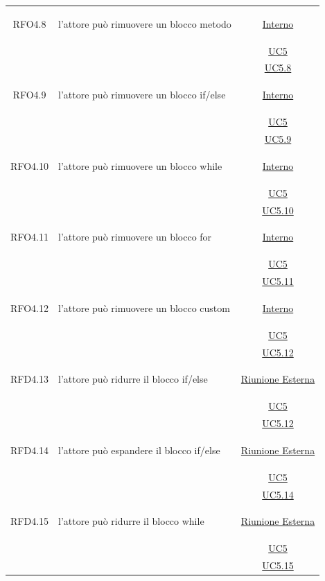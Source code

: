 \begin{itemize}
\begin{itemize}
\begin{itemize}
\begin{itemize}
\begin{longtable}{|c|>{\centering}m{7cm}|c|}
\hypertarget{RFO4.8}{RFO4.8} & l'attore può rimuovere un blocco metodo & \hyperlink{Interno}{Interno}\\
& &\hyperref[UC5]{UC5}\\
& &\hyperref[UC5.8]{UC5.8}\\ \hline

\hypertarget{RFO4.9}{RFO4.9} & l'attore può rimuovere un blocco if/else & \hyperlink{Interno}{Interno}\\
& &\hyperref[UC5]{UC5}\\
& &\hyperref[UC5.9]{UC5.9}\\ \hline

\hypertarget{RFO4.10}{RFO4.10} & l'attore può rimuovere un blocco while & \hyperlink{Interno}{Interno}\\
& &\hyperref[UC5]{UC5}\\
& & \hyperref[UC5.10]{UC5.10}\\ \hline

\hypertarget{RFO4.11}{RFO4.11} & l'attore può rimuovere un blocco for & \hyperlink{Interno}{Interno}\\
& &\hyperref[UC5]{UC5}\\
& &\hyperref[UC5.11]{UC5.11}\\ \hline

\hypertarget{RFO4.12}{RFO4.12} & l'attore può rimuovere un blocco custom & \hyperlink{Interno}{Interno}\\
& &\hyperref[UC5]{UC5}\\
& &\hyperref[UC5.12]{UC5.12}\\ \hline

\hypertarget{RFD4.13}{RFD4.13} & l'attore può ridurre il blocco if/else & \hyperlink{Riunione Esterna}{Riunione Esterna}\\
& &\hyperref[UC5]{UC5}\\
& &\hyperref[UC5.12]{UC5.12}\\ \hline

\hypertarget{RFD4.14}{RFD4.14} & l'attore può espandere il blocco if/else & \hyperlink{Riunione Esterna}{Riunione Esterna}\\
& &\hyperref[UC5]{UC5}\\
& &\hyperref[UC5.14]{UC5.14}\\ \hline

\hypertarget{RFD4.15}{RFD4.15} & l'attore può ridurre il blocco while & \hyperlink{Riunione Esterna}{Riunione Esterna}\\
& &\hyperref[UC5]{UC5}\\
& &\hyperref[UC5.15]{UC5.15}\\ \hline


\end{longtable}
\end{itemize}
\end{itemize}
\end{itemize}
\end{itemize}
